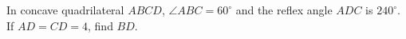 In concave quadrilateral $ABCD$, $\angle ABC=60^\circ$ and the reflex angle $ADC$ is $240^\circ$. If $AD=CD=4$, find $BD$.
